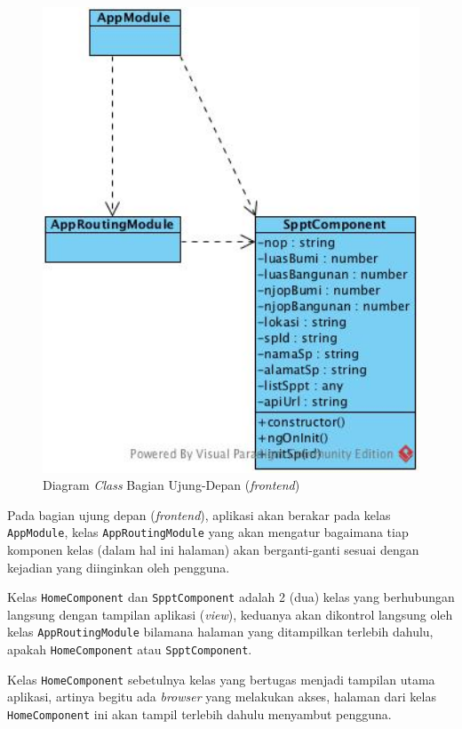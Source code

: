 \documentclass[pdftex,12pt, oneside]{article}
\begin{document}
\begin{figure}[H]
	\centering
	\includegraphics[width=1\textwidth]{./resources/class-diagram-fe}
	\caption{Diagram \textit{Class} Bagian Ujung-Depan (\textit{frontend})}
	\label{fig:class-dia-fe}
\end{figure}

Pada bagian ujung depan (\textit{frontend}), aplikasi akan berakar pada kelas \texttt{AppModule}, kelas \texttt{AppRoutingModule} yang akan mengatur bagaimana tiap komponen kelas (dalam hal ini halaman) akan berganti-ganti sesuai dengan kejadian yang diinginkan oleh pengguna. 

Kelas \texttt{HomeComponent} dan \texttt{SpptComponent} adalah 2 (dua) kelas yang berhubungan langsung dengan tampilan aplikasi (\textit{view}), keduanya akan dikontrol langsung oleh kelas \texttt{AppRoutingModule} bilamana halaman yang ditampilkan terlebih dahulu, apakah \texttt{HomeComponent} atau \texttt{SpptComponent}.

Kelas \texttt{HomeComponent} sebetulnya kelas yang bertugas menjadi tampilan utama aplikasi, artinya begitu ada \textit{browser} yang melakukan akses, halaman dari kelas \texttt{HomeComponent} ini akan tampil terlebih dahulu menyambut pengguna.
\end{document}
